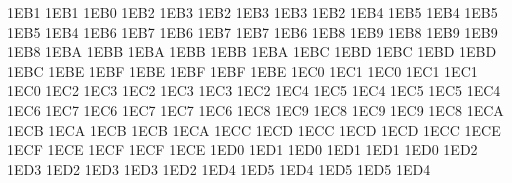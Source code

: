 \setcclcuc 1EB1 1EB1 1EB0 %
\setcclcuc 1EB2 1EB3 1EB2 %
\setcclcuc 1EB3 1EB3 1EB2 %
\setcclcuc 1EB4 1EB5 1EB4 %
\setcclcuc 1EB5 1EB5 1EB4 %
\setcclcuc 1EB6 1EB7 1EB6 %
\setcclcuc 1EB7 1EB7 1EB6 %
\setcclcuc 1EB8 1EB9 1EB8 %
\setcclcuc 1EB9 1EB9 1EB8 %
\setcclcuc 1EBA 1EBB 1EBA %
\setcclcuc 1EBB 1EBB 1EBA %
\setcclcuc 1EBC 1EBD 1EBC %
\setcclcuc 1EBD 1EBD 1EBC %
\setcclcuc 1EBE 1EBF 1EBE %
\setcclcuc 1EBF 1EBF 1EBE %
\setcclcuc 1EC0 1EC1 1EC0 %
\setcclcuc 1EC1 1EC1 1EC0 %
\setcclcuc 1EC2 1EC3 1EC2 %
\setcclcuc 1EC3 1EC3 1EC2 %
\setcclcuc 1EC4 1EC5 1EC4 %
\setcclcuc 1EC5 1EC5 1EC4 %
\setcclcuc 1EC6 1EC7 1EC6 %
\setcclcuc 1EC7 1EC7 1EC6 %
\setcclcuc 1EC8 1EC9 1EC8 %
\setcclcuc 1EC9 1EC9 1EC8 %
\setcclcuc 1ECA 1ECB 1ECA %
\setcclcuc 1ECB 1ECB 1ECA %
\setcclcuc 1ECC 1ECD 1ECC %
\setcclcuc 1ECD 1ECD 1ECC %
\setcclcuc 1ECE 1ECF 1ECE %
\setcclcuc 1ECF 1ECF 1ECE %
\setcclcuc 1ED0 1ED1 1ED0 %
\setcclcuc 1ED1 1ED1 1ED0 %
\setcclcuc 1ED2 1ED3 1ED2 %
\setcclcuc 1ED3 1ED3 1ED2 %
\setcclcuc 1ED4 1ED5 1ED4 %
\setcclcuc 1ED5 1ED5 1ED4 %
